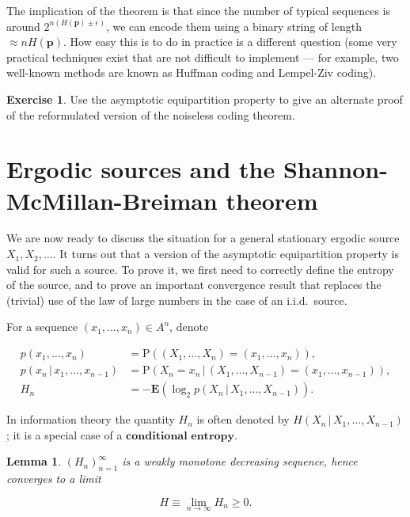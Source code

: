 \documentclass[11pt]{report}
\theoremstyle{plain}
\newtheorem{lem}[thm]{Lemma}
\theoremstyle{definition}
\newtheorem{xexercise}[thm]{Exercise}
\begin{document}
The implication of the theorem is that since the number of typical sequences is around $2^{n(H(\mathbf{p})\pm \epsilon)}$, we can encode them using a binary string of length $\approx nH(\mathbf{p})$. How easy this is to do in practice is a different question (some very practical techniques exist that are not difficult to implement --- for example, two well-known methods are known as Huffman coding and Lempel-Ziv coding).

\begin{xexercise}
Use the asymptotic equipartition property to give an alternate proof of the reformulated version of the noiseless coding theorem.
\end{xexercise}

\section{Ergodic sources and the Shannon-McMillan-Breiman theorem}
We are now ready to discuss the situation for a general stationary ergodic source $X_1,X_2,\ldots$. It turns out that a version of the asymptotic equipartition property is valid for such a source. To prove it, we first need to correctly define the entropy of the source, and to prove an important convergence result that replaces the (trivial) use of the law of large numbers in the case of an i.i.d.\ source.

For a sequence $(x_1,\ldots,x_n)\in A^n$, denote

\begin{align*}
p(x_1,\ldots,x_n) &= \tag{29}\label{eq:psymbols1} \mathrm{P}((X_1,\ldots,X_n)=(x_1,\ldots,x_n)), \\
p(x_n\,|\,x_1,\ldots,x_{n-1}) &= \tag{30}\label{eq:psymbols2} \mathrm{P}(X_n=x_n\,|\,(X_1,\ldots,X_{n-1})=(x_1,\ldots,x_{n-1})),
\\
H_n &= \tag{31}\label{eq:psymbols3} -\mathbf{E}(\log_2 p(X_n\,|\,X_1,\ldots,X_{n-1})).
\end{align*}

In information theory the quantity $H_n$ is often denoted by $H(X_n\,|\, X_1,\ldots,X_{n-1})$; it is a special case of a $\textbf{conditional entropy}$.

\begin{lem}
\label{lem-entropy-ergodic}
$(H_n)_{n=1}^\infty$ is a weakly monotone decreasing sequence, hence converges to a limit

\begin{equation*} \tag{32}\label{eq:entropy-ergodic}
H \equiv \lim_{n\to\infty} H_n \ge 0.
\end{equation*}

\end{lem}
\end{document}
